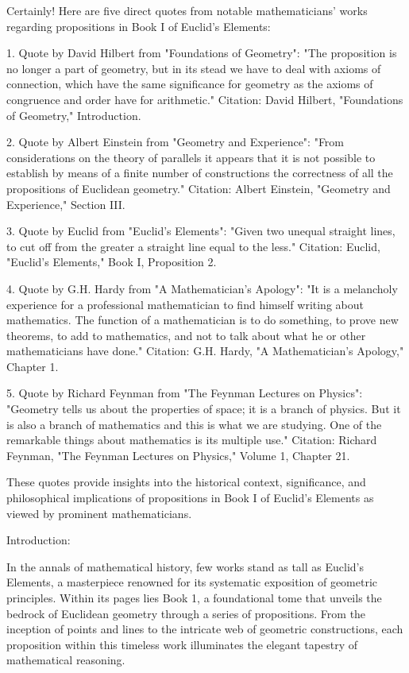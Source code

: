 
Certainly! Here are five direct quotes from notable mathematicians' works regarding propositions in Book I of Euclid's Elements:

1. Quote by David Hilbert from "Foundations of Geometry":
   "The proposition is no longer a part of geometry, but in its stead we have to deal with axioms of connection, which have the same significance for geometry as the axioms of congruence and order have for arithmetic."
   Citation: David Hilbert, "Foundations of Geometry," Introduction.

2. Quote by Albert Einstein from "Geometry and Experience":
   "From considerations on the theory of parallels it appears that it is not possible to establish by means of a finite number of constructions the correctness of all the propositions of Euclidean geometry."
   Citation: Albert Einstein, "Geometry and Experience," Section III.

3. Quote by Euclid from "Euclid's Elements":
   "Given two unequal straight lines, to cut off from the greater a straight line equal to the less."
   Citation: Euclid, "Euclid's Elements," Book I, Proposition 2.

4. Quote by G.H. Hardy from "A Mathematician's Apology":
   "It is a melancholy experience for a professional mathematician to find himself writing about mathematics. The function of a mathematician is to do something, to prove new theorems, to add to mathematics, and not to talk about what he or other mathematicians have done."
   Citation: G.H. Hardy, "A Mathematician's Apology," Chapter 1.

5. Quote by Richard Feynman from "The Feynman Lectures on Physics":
   "Geometry tells us about the properties of space; it is a branch of physics. But it is also a branch of mathematics and this is what we are studying. One of the remarkable things about mathematics is its multiple use."
   Citation: Richard Feynman, "The Feynman Lectures on Physics," Volume 1, Chapter 21.

These quotes provide insights into the historical context, significance, and philosophical implications of propositions in Book I of Euclid's Elements as viewed by prominent mathematicians.






Introduction:

In the annals of mathematical history, few works stand as tall as Euclid's Elements, a masterpiece renowned for its systematic exposition of geometric principles. Within its pages lies Book 1, a foundational tome that unveils the bedrock of Euclidean geometry through a series of propositions. From the inception of points and lines to the intricate web of geometric constructions, each proposition within this timeless work illuminates the elegant tapestry of mathematical reasoning.

